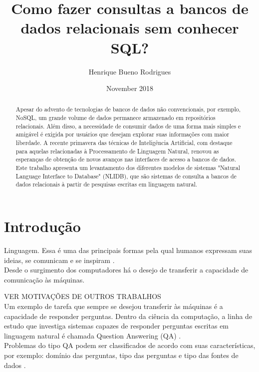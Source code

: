 \documentclass{article}
\title{Como fazer consultas a bancos de dados relacionais sem conhecer SQL?}
\author{Henrique Bueno Rodrigues}
\date{November 2018}
\begin{document}
\maketitle
\begin{abstract}
Apesar do advento de tecnologias de bancos de dados não convencionais, por exemplo, NoSQL, um grande volume de dados permanece armazenado em repositórios relacionais. Além disso, a necessidade de consumir dados de uma forma mais simples e amigável é exigida por usuários que desejam explorar suas informações com maior liberdade. A recente primavera das técnicas de Inteligência Artificial, com destaque para aquelas relacionadas à Processamento de Linguagem Natural, renovou as esperanças de obtenção de novos avanços nas interfaces de acesso a bancos de dados. Este trabalho apresenta um levantamento dos diferentes modelos de sistemas "Natural Language Interface to Database" (NLIDB), que são sistemas de consulta a bancos de dados relacionais à partir de pesquisas escritas em linguagem natural.
\end{abstract}

\section{Introdução}

Linguagem. Essa é uma das principais formas pela qual humanos expressam suas ideias, se comunicam e se inspiram \citep{harari2014sapiens}.\\

Desde o surgimento dos computadores há o desejo de transferir a capacidade de comunicação às máquinas. 

VER MOTIVAÇÕES DE OUTROS TRABALHOS\\

Um exemplo de tarefa que sempre se desejou transferir às máquinas é a capacidade de responder perguntas. Dentro da ciência da computação, a linha de estudo que investiga sistemas capazes de responder perguntas escritas em linguagem natural é chamada Question Answering (QA) \citep{hirschman2001natural}.\\

Problemas do tipo QA podem ser classificados de acordo com suas características, por exemplo: domínio das perguntas, tipo das perguntas e tipo das fontes de dados \citep{mishra2016survey, speech}.\\
\end{document}
